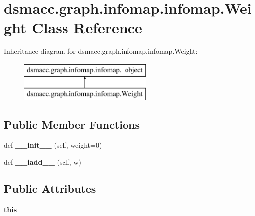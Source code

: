 \hypertarget{classdsmacc_1_1graph_1_1infomap_1_1infomap_1_1Weight}{}\section{dsmacc.\+graph.\+infomap.\+infomap.\+Weight Class Reference}
\label{classdsmacc_1_1graph_1_1infomap_1_1infomap_1_1Weight}
Inheritance diagram for dsmacc.\+graph.\+infomap.\+infomap.\+Weight\+:\begin{figure}[H]
\begin{center}
\leavevmode
\includegraphics[height=2.000000cm]{classdsmacc_1_1graph_1_1infomap_1_1infomap_1_1Weight}
\end{center}
\end{figure}
\subsection*{Public Member Functions}
\begin{DoxyCompactItemize}
\item 
\mbox{\label{classdsmacc_1_1graph_1_1infomap_1_1infomap_1_1Weight_a385a4a13d0c234bacdf59165fee13341}} 
def {\bfseries \+\_\+\+\_\+init\+\_\+\+\_\+} (self, weight=0)
\item 
\mbox{\label{classdsmacc_1_1graph_1_1infomap_1_1infomap_1_1Weight_adf555940215c3b13dbb95be2e8a58ee9}} 
def {\bfseries \+\_\+\+\_\+iadd\+\_\+\+\_\+} (self, w)
\end{DoxyCompactItemize}
\subsection*{Public Attributes}
\begin{DoxyCompactItemize}
\item 
\mbox{\label{classdsmacc_1_1graph_1_1infomap_1_1infomap_1_1Weight_a673dd569855f6a4d8c6407a680a53594}} 
{\bfseries this}
\end{DoxyCompactItemize}
